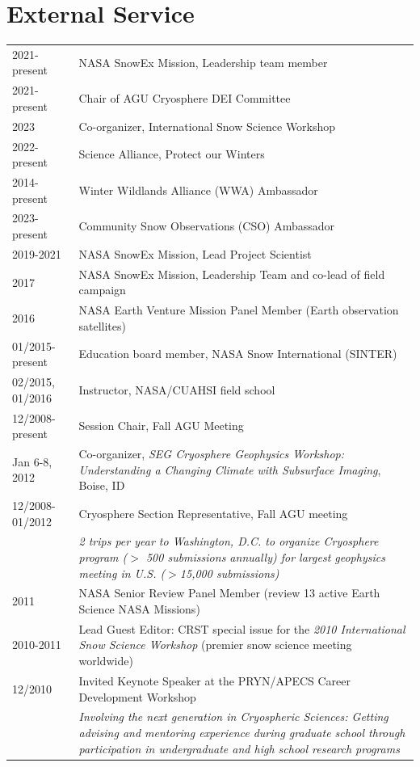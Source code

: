 \documentclass[11pt]{article}
\renewcommand\arraystretch{1}
\begin{document}
\section*{External Service}
\begingroup
\renewcommand\arraystretch{0.7}
\begin{longtable}{p{1.2in}|p{5.7in}}
2021-present & NASA SnowEx Mission, Leadership team member \\
2021-present & Chair of AGU Cryosphere DEI Committee \\
2023 & Co-organizer, International Snow Science Workshop \\ 
2022-present & Science Alliance, Protect our Winters \\
2014-present & Winter Wildlands Alliance (WWA) Ambassador \\
2023- present & Community Snow Observations (CSO) Ambassador \\
2019-2021 & NASA SnowEx Mission, Lead Project Scientist \\
2017 & NASA SnowEx Mission, Leadership Team and co-lead of field campaign \\
2016 & NASA Earth Venture Mission Panel Member (Earth observation satellites) \\
01/2015-present & Education board member, NASA Snow International (SINTER) \\
02/2015, 01/2016 & Instructor, NASA/CUAHSI field school \\
12/2008-present & Session Chair, Fall AGU Meeting \\
Jan 6-8, 2012 & Co-organizer, \textit{SEG Cryosphere Geophysics Workshop: Understanding a Changing Climate with Subsurface Imaging}, Boise, ID \\
12/2008-01/2012 & Cryosphere Section Representative, Fall AGU meeting \\
&\textit{2 trips per year to Washington, D.C. to organize Cryosphere program ($>$ 500 
submissions annually) for largest geophysics meeting in U.S. ($>$15,000 submissions)} \\
2011 & NASA Senior Review Panel Member (review 13 active Earth Science NASA Missions)  \\
2010-2011 & Lead Guest Editor: CRST special issue for the \textit{2010 International Snow
Science Workshop} (premier snow science meeting worldwide) \\
12/2010 & Invited Keynote Speaker at the PRYN/APECS Career Development Workshop \\
& \textit{Involving the next generation in Cryospheric Sciences: Getting advising and mentoring experience during graduate school through participation in undergraduate and high school research programs} \\


\end{longtable}
\end{document}
